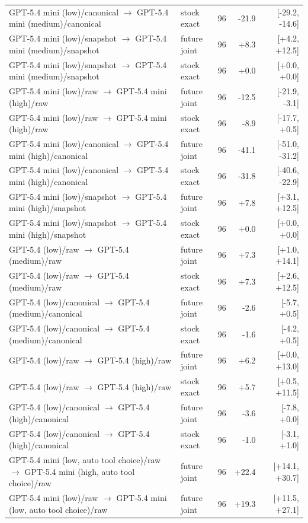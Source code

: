 \begin{table}[htbp]
{\begin{tabular}{lllrr}
GPT-5.4 mini (low)/canonical $\to$ GPT-5.4 mini (medium)/canonical & stock exact & 96 & -21.9 & [-29.2, -14.6] \\
GPT-5.4 mini (low)/snapshot $\to$ GPT-5.4 mini (medium)/snapshot & future joint & 96 & +8.3 & [+4.2, +12.5] \\
GPT-5.4 mini (low)/snapshot $\to$ GPT-5.4 mini (medium)/snapshot & stock exact & 96 & +0.0 & [+0.0, +0.0] \\
GPT-5.4 mini (low)/raw $\to$ GPT-5.4 mini (high)/raw & future joint & 96 & -12.5 & [-21.9, -3.1] \\
GPT-5.4 mini (low)/raw $\to$ GPT-5.4 mini (high)/raw & stock exact & 96 & -8.9 & [-17.7, +0.5] \\
GPT-5.4 mini (low)/canonical $\to$ GPT-5.4 mini (high)/canonical & future joint & 96 & -41.1 & [-51.0, -31.2] \\
GPT-5.4 mini (low)/canonical $\to$ GPT-5.4 mini (high)/canonical & stock exact & 96 & -31.8 & [-40.6, -22.9] \\
GPT-5.4 mini (low)/snapshot $\to$ GPT-5.4 mini (high)/snapshot & future joint & 96 & +7.8 & [+3.1, +12.5] \\
GPT-5.4 mini (low)/snapshot $\to$ GPT-5.4 mini (high)/snapshot & stock exact & 96 & +0.0 & [+0.0, +0.0] \\
GPT-5.4 (low)/raw $\to$ GPT-5.4 (medium)/raw & future joint & 96 & +7.3 & [+1.0, +14.1] \\
GPT-5.4 (low)/raw $\to$ GPT-5.4 (medium)/raw & stock exact & 96 & +7.3 & [+2.6, +12.5] \\
GPT-5.4 (low)/canonical $\to$ GPT-5.4 (medium)/canonical & future joint & 96 & -2.6 & [-5.7, +0.5] \\
GPT-5.4 (low)/canonical $\to$ GPT-5.4 (medium)/canonical & stock exact & 96 & -1.6 & [-4.2, +0.5] \\
GPT-5.4 (low)/raw $\to$ GPT-5.4 (high)/raw & future joint & 96 & +6.2 & [+0.0, +13.0] \\
GPT-5.4 (low)/raw $\to$ GPT-5.4 (high)/raw & stock exact & 96 & +5.7 & [+0.5, +11.5] \\
GPT-5.4 (low)/canonical $\to$ GPT-5.4 (high)/canonical & future joint & 96 & -3.6 & [-7.8, +0.0] \\
GPT-5.4 (low)/canonical $\to$ GPT-5.4 (high)/canonical & stock exact & 96 & -1.0 & [-3.1, +1.0] \\
GPT-5.4 mini (low, auto tool choice)/raw $\to$ GPT-5.4 mini (high, auto tool choice)/raw & future joint & 96 & +22.4 & [+14.1, +30.7] \\
GPT-5.4 mini (low)/raw $\to$ GPT-5.4 mini (low, auto tool choice)/raw & future joint & 96 & +19.3 & [+11.5, +27.1] \\

\end{tabular}}
\end{table}
